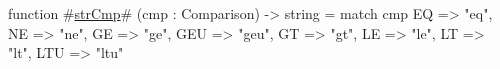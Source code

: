 function #\hyperref[zstrCmp]{strCmp}# (cmp : Comparison) -> string = match cmp {
  EQ  => "eq",
  NE  => "ne",
  GE  => "ge",
  GEU => "geu",
  GT  => "gt",
  LE  => "le",
  LT  => "lt",
  LTU => "ltu"
}
